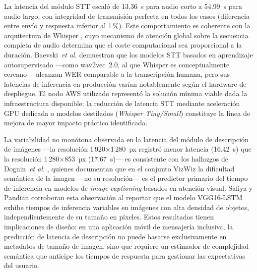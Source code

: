 \documentclass[journal]{IEEEtran}
\begin{document}
			La latencia del m\'odulo STT escal\'o de 13.36~s para audio corto a 54.99~s para audio largo, con integridad de transmisi\'on perfecta en todos los casos (diferencia entre env\'io y respuesta inferior al 1\,\%). Este comportamiento es coherente con la arquitectura de Whisper \cite{radford2023}, cuyo mecanismo de atenci\'on global sobre la secuencia completa de audio determina que el coste computacional sea proporcional a la duraci\'on. Baevski~\textit{et al.} \cite{baevski2020} demuestran que los modelos STT basados en aprendizaje autosupervisado ---como wav2vec~2.0, al que Whisper es conceptualmente cercano--- alcanzan WER comparable a la transcripci\'on humana, pero sus latencias de inferencia en producci\'on var\'ian notablemente seg\'un el hardware de despliegue. El nodo AWS utilizado represent\'o la soluci\'on m\'inima viable dada la infraestructura disponible; la reducci\'on de latencia STT mediante aceleraci\'on GPU dedicada o modelos destilados (\textit{Whisper Tiny/Small}) constituye la l\'inea de mejora de mayor impacto pr\'actico identificada.
			
			La variabilidad no mon\'otona observada en la latencia del m\'odulo de descripci\'on de im\'agenes ---la resoluci\'on 1\,920$\times$1\,280~px registr\'o menor latencia (16.42~s) que la resoluci\'on 1\,280$\times$853~px (17.67~s)--- es consistente con los hallazgos de Dognin~\textit{et al.} \cite{dognin2021}, quienes documentan que en el conjunto VizWiz la dificultad sem\'antica de la imagen ---no su resoluci\'on--- es el predictor primario del tiempo de inferencia en modelos de \textit{image captioning} basados en atenci\'on visual. Safiya y Pandian \cite{safiya2024} corroboran esta observaci\'on al reportar que el modelo VGG16-LSTM exhibe tiempos de inferencia variables en im\'agenes con alta densidad de objetos, independientemente de su tama\~no en p\'ixeles. Estos resultados tienen implicaciones de dise\~no: en una aplicaci\'on m\'ovil de mensajer\'ia inclusiva, la predicci\'on de latencia de descripci\'on no puede basarse exclusivamente en metadatos de tama\~no de imagen, sino que requiere un estimador de complejidad sem\'antica que anticipe los tiempos de respuesta para gestionar las expectativas del usuario.
			
\end{document}
